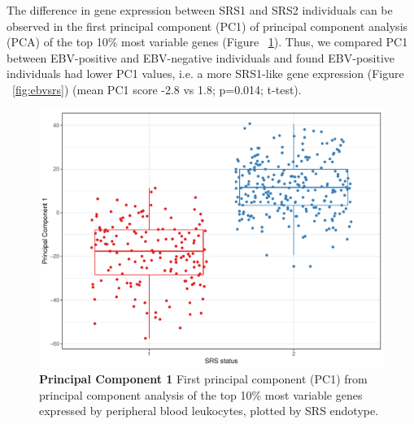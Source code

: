The difference in gene expression between SRS1 and SRS2 individuals can be observed in the first principal component (PC1) of principal component analysis (PCA) of the top 10\% most variable genes (Figure ~\ref{fig:pc1}). Thus, we compared PC1 between EBV-positive and EBV-negative individuals and found EBV-positive individuals had lower PC1 values, i.e. a more SRS1-like gene expression (Figure ~\ref{fig:ebvsrs}) (mean PC1 score -2.8 vs 1.8; p=0.014; t-test).

\FloatBarrier
\begin{figure}[htbp]
\centering
\includegraphics[scale=0.6]{./Results3/Images/PC1.pdf}
\caption[Principal Component 1]{\textbf{Principal Component 1} First principal component (PC1) from principal component analysis of the top 10\% most variable genes expressed by peripheral blood leukocytes, plotted by SRS endotype.}
\label{fig:pc1}
\end{figure}


